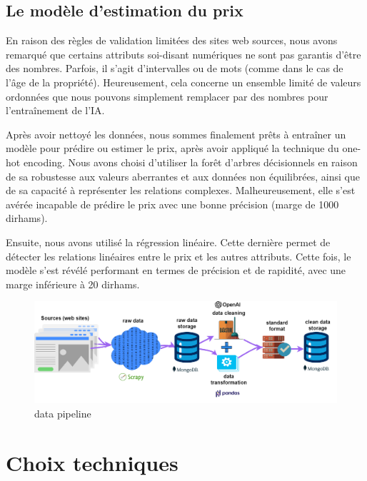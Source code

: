 \documentclass[a4paper,12pt]{report}
\numberwithin{equation}{section}
\begin{document}
\subsection{Le modèle d’estimation du prix}
\par 
En raison des règles de validation limitées des sites web sources, nous avons remarqué que certains attributs soi-disant numériques ne sont pas garantis d'être des nombres. Parfois, il s'agit d'intervalles ou de mots (comme dans le cas de l'âge de la propriété). Heureusement, cela concerne un ensemble limité de valeurs ordonnées que nous pouvons simplement remplacer par des nombres pour l'entraînement de l’IA.
\\ \par
Après avoir nettoyé les données, nous sommes finalement prêts à entraîner un modèle pour prédire ou estimer le prix, après avoir appliqué la technique du one-hot encoding. Nous avons choisi d’utiliser la forêt d'arbres décisionnels en raison de sa robustesse aux valeurs aberrantes et aux données non équilibrées, ainsi que de sa capacité à représenter les relations complexes. Malheureusement, elle s'est avérée incapable de prédire le prix avec une bonne précision (marge de 1000 dirhams).
\\ \par
Ensuite, nous avons utilisé la régression linéaire. Cette dernière permet de détecter les relations linéaires entre le prix et les autres attributs. Cette fois, le modèle s'est révélé performant en termes de précision et de rapidité, avec une marge inférieure à 20 dirhams.
\begin{figure}[H]
    \centering
    \includegraphics[width=\textwidth]{web-scrapping-architecture.png}
    \caption{data pipeline}
    \label{fig:data pipeline}
\end{figure}
\newpage
\section{Choix techniques}
\end{document}
